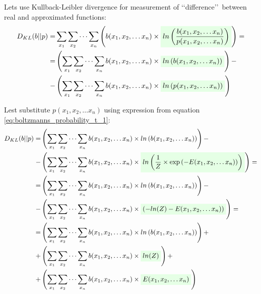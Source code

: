 \documentclass[fleqn,leqno]{article}
\newcommand{\highlight}[1]{\colorbox{green!10}{$\displaystyle#1$}}
\begin{document}
Lets use Kullback-Leibler divergence for measurement of \lq \lq difference\rq \rq\ between real and approximated functions:
\begin{equation}
\begin{split}
D_{KL}(b||p) = & \sum_{x_1} \sum_{x_2} \cdots \sum_{x_n} \left( b(x_1, x_2, \dots x_n) \times \highlight{ ln \left( {b(x_1, x_2, \dots x_n) \over p(x_1, x_2, \dots x_n)} \right) } \right) = \\
            = & \left( \sum_{x_1} \sum_{x_2} \cdots \sum_{x_n} b(x_1, x_2, \dots x_n) \times \highlight{ ln \left( b(x_1, x_2, \dots x_n) \right) } \right) - \\
             - & \left( \sum_{x_1} \sum_{x_2} \cdots \sum_{x_n} b(x_1, x_2, \dots x_n) \times \highlight{ ln \left( p(x_1, x_2, \dots x_n) \right) } \right)
\end{split}
\end{equation}

Lest substitute $p(x_1, x_2, \dots x_n)$ using expression from equation \eqref{eq:boltzmanns_probability_t_1}:
\begin{equation}
\begin{split}
D_{KL}(b||p) = & \left( \sum_{x_1} \sum_{x_2} \cdots \sum_{x_n} b(x_1, x_2, \dots x_n) \times ln \left( b(x_1, x_2, \dots x_n) \right) \right) - \\
             - & \left( \sum_{x_1} \sum_{x_2} \cdots \sum_{x_n} b(x_1, x_2, \dots x_n) \times \highlight{ ln \left( {1 \over Z} \times \exp \left(-E(x_1, x_2, \dots x_n) \right) \right) } \right) = \\
            = & \left( \sum_{x_1} \sum_{x_2} \cdots \sum_{x_n} b(x_1, x_2, \dots x_n) \times ln \left( b(x_1, x_2, \dots x_n) \right) \right) - \\
             - & \left( \sum_{x_1} \sum_{x_2} \cdots \sum_{x_n} b(x_1, x_2, \dots x_n) \times \highlight{ \left( -ln(Z) -E(x_1, x_2, \dots x_n) \right) } \right) = \\
            = & \left( \sum_{x_1} \sum_{x_2} \cdots \sum_{x_n} b(x_1, x_2, \dots x_n) \times ln \left( b(x_1, x_2, \dots x_n) \right) \right) + \\
            + & \left( \sum_{x_1} \sum_{x_2} \cdots \sum_{x_n} b(x_1, x_2, \dots x_n) \times \highlight{ ln(Z) } \right) + \\
             + & \left( \sum_{x_1} \sum_{x_2} \cdots \sum_{x_n} b(x_1, x_2, \dots x_n) \times \highlight{ E(x_1, x_2, \dots x_n) } \right) \\
\end{split}
\end{equation}
\end{document}
